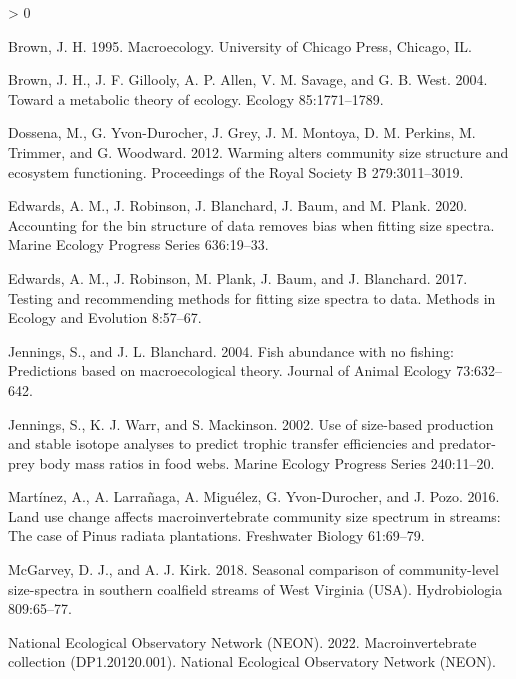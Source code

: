 \documentclass[
]{article}
\newlength{\cslhangindent}
\newenvironment{CSLReferences}[2] %
 {%
  \setlength{\parindent}{0pt}
  \ifodd #1 \everypar{\setlength{\hangindent}{\cslhangindent}}\ignorespaces\fi
  \ifnum #2 > 0
  \setlength{\parskip}{#2\baselineskip}
  \fi
 }%
 {}
\begin{document}
\hypertarget{refs}{}
\begin{CSLReferences}{1}{0}
\leavevmode\hypertarget{ref-Brown1995}{}%
Brown, J. H. 1995. Macroecology. {University of Chicago Press},
{Chicago, IL}.

\leavevmode\hypertarget{ref-Brown2004}{}%
Brown, J. H., J. F. Gillooly, A. P. Allen, V. M. Savage, and G. B. West.
2004. Toward a metabolic theory of ecology. Ecology 85:1771--1789.

\leavevmode\hypertarget{ref-dossenaWarmingAltersCommunity2012}{}%
Dossena, M., G. Yvon-Durocher, J. Grey, J. M. Montoya, D. M. Perkins, M.
Trimmer, and G. Woodward. 2012. Warming alters community size structure
and ecosystem functioning. Proceedings of the Royal Society B
279:3011--3019.

\leavevmode\hypertarget{ref-edwards2020}{}%
Edwards, A. M., J. Robinson, J. Blanchard, J. Baum, and M. Plank. 2020.
Accounting for the bin structure of data removes bias when fitting size
spectra. Marine Ecology Progress Series 636:19--33.

\leavevmode\hypertarget{ref-Edwards2017}{}%
Edwards, A. M., J. Robinson, M. Plank, J. Baum, and J. Blanchard. 2017.
Testing and recommending methods for fitting size spectra to data.
Methods in Ecology and Evolution 8:57--67.

\leavevmode\hypertarget{ref-jennings2004}{}%
Jennings, S., and J. L. Blanchard. 2004. Fish abundance with no fishing:
Predictions based on macroecological theory. Journal of Animal Ecology
73:632--642.

\leavevmode\hypertarget{ref-Jennings2002}{}%
Jennings, S., K. J. Warr, and S. Mackinson. 2002. Use of size-based
production and stable isotope analyses to predict trophic transfer
efficiencies and predator-prey body mass ratios in food webs. Marine
Ecology Progress Series 240:11--20.

\leavevmode\hypertarget{ref-martinez2016}{}%
Martínez, A., A. Larrañaga, A. Miguélez, G. Yvon-Durocher, and J. Pozo.
2016. Land use change affects macroinvertebrate community size spectrum
in streams: The case of {Pinus} radiata plantations. Freshwater Biology
61:69--79.

\leavevmode\hypertarget{ref-mcgarveySeasonalComparisonCommunitylevel2018}{}%
McGarvey, D. J., and A. J. Kirk. 2018. Seasonal comparison of
community-level size-spectra in southern coalfield streams of {West
Virginia} ({USA}). Hydrobiologia 809:65--77.

\leavevmode\hypertarget{ref-NEON_Inverts2022}{}%
National Ecological Observatory Network (NEON). 2022. Macroinvertebrate
collection ({DP1}.20120.001). {National Ecological Observatory Network
(NEON)}.


\end{CSLReferences}
\end{document}
